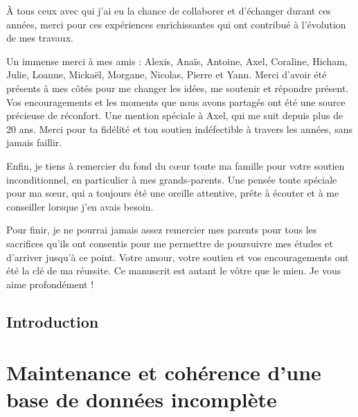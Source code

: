 À tous ceux avec qui j'ai eu la chance de collaborer et d'échanger durant ces années, merci pour ces expériences enrichissantes qui ont contribué à l'évolution de mes travaux.

Un immense merci à mes amis : Alexis, Anaïs, Antoine, Axel, Coraline, Hicham, Julie, Loanne, Mickaël, Morgane, Nicolas, Pierre et Yann.
Merci d'avoir été présents à mes côtés pour me changer les idées, me soutenir et répondre présent.
Vos encouragements et les moments que nous avons partagés ont été une source précieuse de réconfort.
Une mention spéciale à Axel, qui me suit depuis plus de 20 ans.
Merci pour ta fidélité et ton soutien indéfectible à travers les années, sans jamais faillir.

Enfin, je tiens à remercier du fond du cœur toute ma famille pour votre soutien inconditionnel, en particulier à mes grands-parents.
Une pensée toute spéciale pour ma sœur, qui a toujours été une oreille attentive, prête à écouter et à me conseiller lorsque j'en avais besoin.

Pour finir, je ne pourrai jamais assez remercier mes parents pour tous les sacrifices qu'ils ont consentis pour me permettre de poursuivre mes études et d'arriver jusqu'à ce point.
Votre amour, votre soutien et vos encouragements ont été la clé de ma réussite.
Ce manuscrit est autant le vôtre que le mien.
Je vous aime profondément !

\newpage

\dominitoc
\tableofcontents
{}
\listoffigures
{}
\listoftables

\mainmatter

\chapter{Introduction}
\label{chp:intro}
\minitoc



\part{Maintenance et cohérence d'une base de données incomplète}
\label{part:update}
\glsresetall


